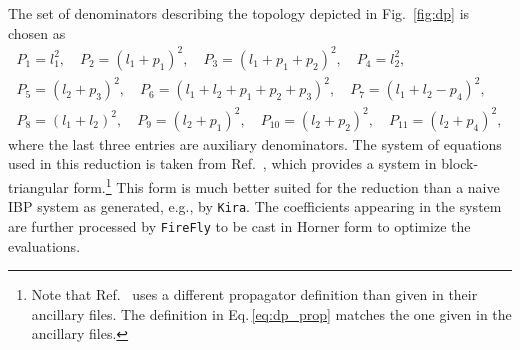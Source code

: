 \documentclass[11pt,a4paper,DIV=11,numbers=noenddot,parskip=half]{scrartcl}
\newcommand{\code}[1]{\texttt{#1}}
\newcommand*{\kira}{\code{Kira}}
\begin{document}
The set of denominators describing the topology depicted in Fig.~\ref{fig:dp} is chosen as
\begin{equation}
  \begin{gathered}
    P_1 = l_1^2,\quad
    P_2 = (l_1 + p_1)^2,\quad
    P_3 = (l_1 + p_1 + p_2)^2,\quad
    P_4 = l_2^2,\\
    P_5 = (l_2 + p_3)^2,\quad
    P_6 = (l_1 + l_2 + p_1 + p_2 + p_3)^2,\quad
    P_7 = (l_1 + l_2 - p_4)^2,\\
    P_8 = (l_1 + l_2)^2,\quad
    P_9 = (l_2 + p_1)^2,\quad
    P_{10} = (l_2 + p_2)^2,\quad
    P_{11} = (l_2 + p_4)^2,
  \end{gathered}
  \label{eq:dp_prop}
\end{equation}
where the last three entries are auxiliary denominators. The system of equations used in this reduction is taken from Ref.~\cite{Guan:2019bcx}, which provides a system in block-triangular form.\footnote{Note that Ref.~\cite{Guan:2019bcx} uses a different propagator definition than given in their ancillary files. The definition in Eq.\,\eqref{eq:dp_prop} matches the one given in the ancillary files.}
This form is much better suited for the reduction than a naive IBP system as generated, e.g., by \kira{}.
The coefficients appearing in the system are further processed by \code{FireFly} to be cast in Horner form to optimize the evaluations.
\end{document}
